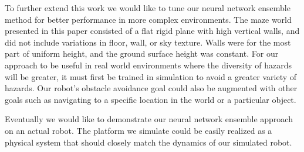\documentclass{article}
\begin{document}
		To further extend this work we would like to tune our neural network ensemble method for better performance in more complex environments.  The maze world presented in this paper consisted of a flat rigid plane with high vertical walls, and did not include variations in floor, wall, or sky texture.  Walls were for the most part of uniform height, and the ground surface height was constant.  For our approach to be useful in real world environments where the diversity of hazards will be greater, it must first be trained in simulation to avoid a greater variety of hazards.  Our robot's obstacle avoidance goal could also be augmented with other goals such as navigating to a specific location in the world or a particular object.  
	
		Eventually we would like to demonstrate our neural network ensemble approach on an actual robot.  The platform we simulate could be easily realized as a physical system that should closely match the dynamics of our simulated robot.

	\vspace{-6pt}

	
	
\end{document}
